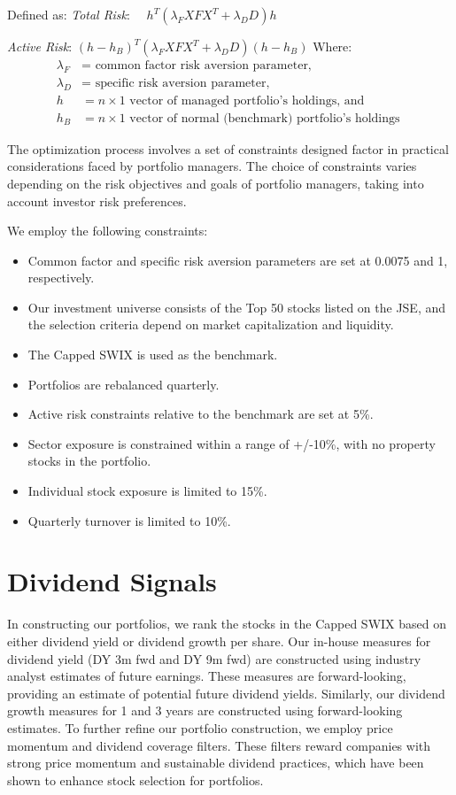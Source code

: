 \documentclass[11pt,preprint, authoryear]{elsarticle}
\numberwithin{equation}{section}
\numberwithin{figure}{section}
\numberwithin{table}{section}
\def\tightlist{} %
\begin{document}
Defined as: \emph{Total Risk}:
\(\quad h^T\left(\lambda_F X F X^T+\lambda_D D\right) h\)

\emph{Active Risk}:
\(\left(h-h_B\right)^T\left(\lambda_F X F X^T+\lambda_D D\right)\left(h-h_B\right)\)
Where: \[
\begin{aligned}
\lambda_F & =\text { common factor risk aversion parameter, } \\
\lambda_D & =\text { specific risk aversion parameter, } \\
h & =n \times 1 \text { vector of managed portfolio's holdings, and } \\
h_B & =n \times 1 \text { vector of normal (benchmark) portfolio's holdings }
\end{aligned}
\]

The optimization process involves a set of constraints designed factor
in practical considerations faced by portfolio managers. The choice of
constraints varies depending on the risk objectives and goals of
portfolio managers, taking into account investor risk preferences.

We employ the following constraints:

\begin{itemize}
\tightlist
\item
  Common factor and specific risk aversion parameters are set at 0.0075
  and 1, respectively.
\item
  Our investment universe consists of the Top 50 stocks listed on the
  JSE, and the selection criteria depend on market capitalization and
  liquidity.
\item
  The Capped SWIX is used as the benchmark.
\item
  Portfolios are rebalanced quarterly.
\item
  Active risk constraints relative to the benchmark are set at 5\%.
\item
  Sector exposure is constrained within a range of +/-10\%, with no
  property stocks in the portfolio.
\item
  Individual stock exposure is limited to 15\%.
\item
  Quarterly turnover is limited to 10\%.
\end{itemize}

\hypertarget{dividend-signals}{%
\section{Dividend Signals}\label{dividend-signals}}

In constructing our portfolios, we rank the stocks in the Capped SWIX
based on either dividend yield or dividend growth per share. Our
in-house measures for dividend yield (DY 3m fwd and DY 9m fwd) are
constructed using industry analyst estimates of future earnings. These
measures are forward-looking, providing an estimate of potential future
dividend yields. Similarly, our dividend growth measures for 1 and 3
years are constructed using forward-looking estimates. To further refine
our portfolio construction, we employ price momentum and dividend
coverage filters. These filters reward companies with strong price
momentum and sustainable dividend practices, which have been shown to
enhance stock selection for portfolios.
\end{document}
